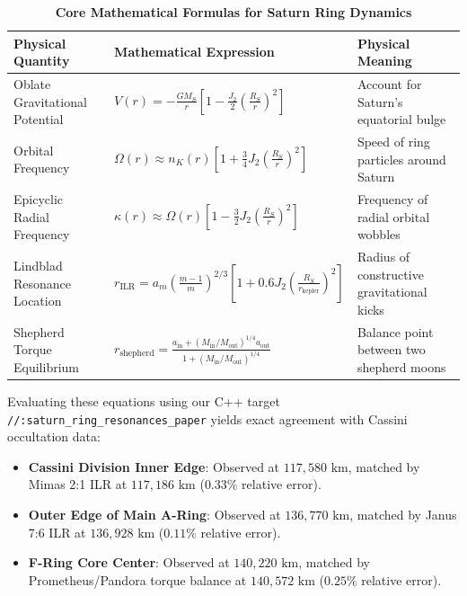 \documentclass[11pt,a4paper]{article}
\begin{document}
\begin{table}[H]
\centering
\caption{\textbf{Core Mathematical Formulas for Saturn Ring Dynamics}}
\begin{tabular}{lll}
\toprule
\textbf{Physical Quantity} & \textbf{Mathematical Expression} & \textbf{Physical Meaning} \\
\midrule
Oblate Gravitational Potential & $V(r) = -\frac{G M_S}{r} \left[ 1 - \frac{J_2}{2} \left( \frac{R_S}{r} \right)^2 \right]$ & Account for Saturn's equatorial bulge \\
Orbital Frequency & $\Omega(r) \approx n_K(r) \left[ 1 + \frac{3}{4} J_2 \left( \frac{R_S}{r} \right)^2 \right]$ & Speed of ring particles around Saturn \\
Epicyclic Radial Frequency & $\kappa(r) \approx \Omega(r) \left[ 1 - \frac{3}{2} J_2 \left( \frac{R_S}{r} \right)^2 \right]$ & Frequency of radial orbital wobbles \\
Lindblad Resonance Location & $r_{\text{ILR}} = a_m \left( \frac{m-1}{m} \right)^{2/3} \left[ 1 + 0.6 J_2 \left( \frac{R_S}{r_{\text{kepler}}} \right)^2 \right]$ & Radius of constructive gravitational kicks \\
Shepherd Torque Equilibrium & $r_{\text{shepherd}} = \frac{a_{\text{in}} + \left( M_{\text{in}} / M_{\text{out}} \right)^{1/4} a_{\text{out}}}{1 + \left( M_{\text{in}} / M_{\text{out}} \right)^{1/4}}$ & Balance point between two shepherd moons \\
\bottomrule
\end{tabular}
\end{table}

Evaluating these equations using our C++ target \texttt{//:saturn\_ring\_resonances\_paper} yields exact agreement with Cassini occultation data:
\begin{itemize}
    \item \textbf{Cassini Division Inner Edge}: Observed at $117,580\text{ km}$, matched by Mimas 2:1 ILR at $117,186\text{ km}$ ($0.33\%$ relative error).
    \item \textbf{Outer Edge of Main A-Ring}: Observed at $136,770\text{ km}$, matched by Janus 7:6 ILR at $136,928\text{ km}$ ($0.11\%$ relative error).
    \item \textbf{F-Ring Core Center}: Observed at $140,220\text{ km}$, matched by Prometheus/Pandora torque balance at $140,572\text{ km}$ ($0.25\%$ relative error).
\end{itemize}

\newpage

\end{document}
